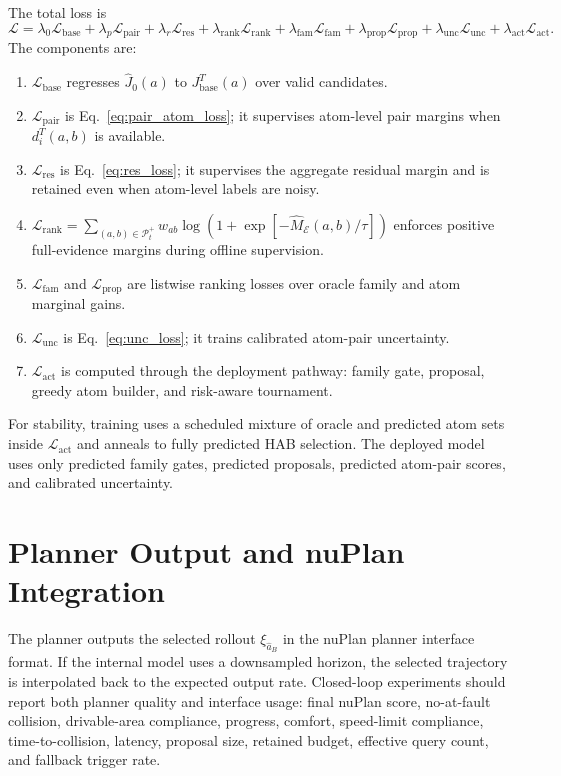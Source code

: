 \documentclass{article}
\newcommand{\E}{\mathcal{E}}
\begin{document}
The total loss is
\begin{equation}
\mathcal L=
\lambda_0\mathcal L_{\mathrm{base}}
+\lambda_p\mathcal L_{\mathrm{pair}}
+\lambda_r\mathcal L_{\mathrm{res}}
+\lambda_{\mathrm{rank}}\mathcal L_{\mathrm{rank}}
+\lambda_{\mathrm{fam}}\mathcal L_{\mathrm{fam}}
+\lambda_{\mathrm{prop}}\mathcal L_{\mathrm{prop}}
+\lambda_{\mathrm{unc}}\mathcal L_{\mathrm{unc}}
+\lambda_{\mathrm{act}}\mathcal L_{\mathrm{act}}.
\end{equation}
The components are:
\begin{enumerate}[leftmargin=*]
    \item $\mathcal L_{\mathrm{base}}$ regresses $\hat J_0(a)$ to $J_{\mathrm{base}}^T(a)$ over valid candidates.
    \item $\mathcal L_{\mathrm{pair}}$ is Eq.~\eqref{eq:pair_atom_loss}; it supervises atom-level pair margins when $d_i^T(a,b)$ is available.
    \item $\mathcal L_{\mathrm{res}}$ is Eq.~\eqref{eq:res_loss}; it supervises the aggregate residual margin and is retained even when atom-level labels are noisy.
    \item $\mathcal L_{\mathrm{rank}}=\sum_{(a,b)\in\mathcal P_t^+}w_{ab}\log(1+\exp[-\hat M_{\E}(a,b)/\tau])$ enforces positive full-evidence margins during offline supervision.
    \item $\mathcal L_{\mathrm{fam}}$ and $\mathcal L_{\mathrm{prop}}$ are listwise ranking losses over oracle family and atom marginal gains.
    \item $\mathcal L_{\mathrm{unc}}$ is Eq.~\eqref{eq:unc_loss}; it trains calibrated atom-pair uncertainty.
    \item $\mathcal L_{\mathrm{act}}$ is computed through the deployment pathway: family gate, proposal, greedy atom builder, and risk-aware tournament.
\end{enumerate}
For stability, training uses a scheduled mixture of oracle and predicted atom sets inside $\mathcal L_{\mathrm{act}}$ and anneals to fully predicted HAB selection. The deployed model uses only predicted family gates, predicted proposals, predicted atom-pair scores, and calibrated uncertainty.

\section{Planner Output and nuPlan Integration}
\label{app:integration}

The planner outputs the selected rollout $\xi_{\hat a_B}$ in the nuPlan planner interface format. If the internal model uses a downsampled horizon, the selected trajectory is interpolated back to the expected output rate. Closed-loop experiments should report both planner quality and interface usage: final nuPlan score, no-at-fault collision, drivable-area compliance, progress, comfort, speed-limit compliance, time-to-collision, latency, proposal size, retained budget, effective query count, and fallback trigger rate.
\end{document}
